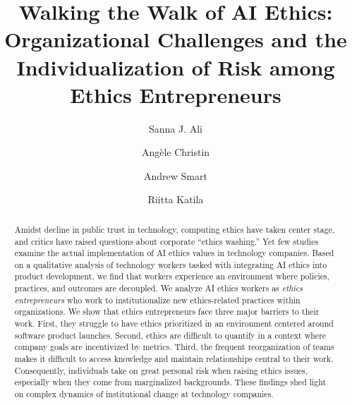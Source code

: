 \documentclass[sigconf]{acmart}
\begin{document}
\title [Walking the Walk of AI Ethics] {Walking the Walk of AI Ethics: Organizational Challenges and the Individualization of Risk among Ethics Entrepreneurs}


\author{Sanna J. Ali}
\author{Angèle Christin}

\author{Andrew Smart}

\author{Riitta Katila}

\renewcommand{\shortauthors}{Ali, Christin, Smart, Katila}

\begin{abstract}
Amidst decline in public trust in technology, computing ethics have taken center stage, and critics have raised questions about corporate “ethics washing.” Yet few studies examine the actual implementation of AI ethics values in technology companies. Based on a qualitative analysis of technology workers tasked with integrating AI ethics into product development, we find that workers experience an environment where policies, practices, and outcomes are decoupled. We analyze AI ethics workers as \textit{ethics entrepreneurs} who work to institutionalize new ethics-related practices within organizations. We show that ethics entrepreneurs face three major barriers to their work. First, they struggle to have ethics prioritized in an environment centered around software product launches. Second, ethics are difficult to quantify in a context where company goals are incentivized by metrics. Third, the frequent reorganization of teams makes it difficult to access knowledge and maintain relationships central to their work. Consequently, individuals take on great personal risk when raising ethics issues, especially when they come from marginalized backgrounds. These findings shed light on complex dynamics of institutional change at technology companies.
\end{abstract}
\end{document}
